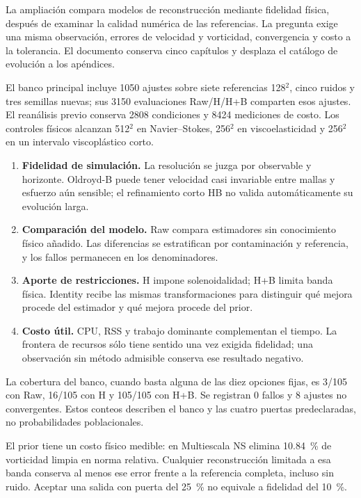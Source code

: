 La ampliación compara modelos de reconstrucción mediante fidelidad física, después de examinar la calidad numérica de las referencias. La pregunta exige una misma observación, errores de velocidad y vorticidad, convergencia y costo a la tolerancia. El documento conserva cinco capítulos y desplaza el catálogo de evolución a los apéndices.

El banco principal incluye 1050 ajustes sobre siete referencias 128$^2$, cinco ruidos y tres semillas nuevas; sus 3150 evaluaciones Raw/H/H+B comparten esos ajustes. El reanálisis previo conserva 2808 condiciones y 8424 mediciones de costo. Los controles físicos alcanzan 512$^2$ en Navier–Stokes, 256$^2$ en viscoelasticidad y 256$^2$ en un intervalo viscoplástico corto.

\begin{enumerate}
\item \textbf{Fidelidad de simulación.} La resolución se juzga por observable y horizonte. Oldroyd-B puede tener velocidad casi invariable entre mallas y esfuerzo aún sensible; el refinamiento corto HB no valida automáticamente su evolución larga.
\item \textbf{Comparación del modelo.} Raw compara estimadores sin conocimiento físico añadido. Las diferencias se estratifican por contaminación y referencia, y los fallos permanecen en los denominadores.
\item \textbf{Aporte de restricciones.} H impone solenoidalidad; H+B limita banda física. Identity recibe las mismas transformaciones para distinguir qué mejora procede del estimador y qué mejora procede del prior.
\item \textbf{Costo útil.} CPU, RSS y trabajo dominante complementan el tiempo. La frontera de recursos sólo tiene sentido una vez exigida fidelidad; una observación sin método admisible conserva ese resultado negativo.
\end{enumerate}

La cobertura del banco, cuando basta alguna de las diez opciones fijas, es 3/105 con Raw, 16/105 con H y 105/105 con H+B. Se registran 0 fallos y 8 ajustes no convergentes. Estos conteos describen el banco y las cuatro puertas predeclaradas, no probabilidades poblacionales.

El prior tiene un costo físico medible: en Multiescala NS elimina 10.84~\% de vorticidad limpia en norma relativa. Cualquier reconstrucción limitada a esa banda conserva al menos ese error frente a la referencia completa, incluso sin ruido. Aceptar una salida con puerta del 25~\% no equivale a fidelidad del 10~\%.


